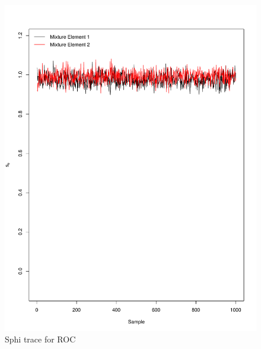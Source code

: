\documentclass[11pt]{labbook}
\begin{document}
    \begin{figure}
        \centering
        \includegraphics[scale=.65]{FONSE_Plots/2016/June_27/ROC/Run1_SphiTrace}
        \caption{Sphi trace for ROC}
        \label{fig:JUN27_RSPHI}
    \end{figure}
\end{document}
